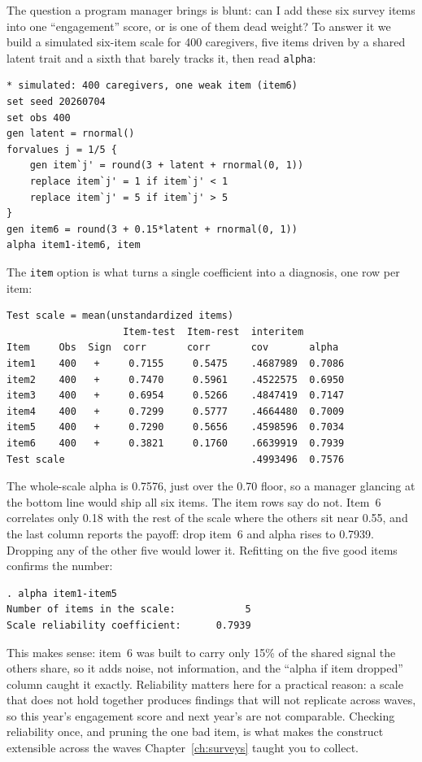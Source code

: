 \documentclass[
    a4paper,
    fontsize=10pt,
    twoside=true,
    numbers=noenddot,
]{kaobook}
\begin{document}
The question a program manager brings is blunt: can I add these six survey items into one \enquote{engagement} score, or is one of them dead weight? To answer it we build a simulated six-item scale for 400 caregivers, five items driven by a shared latent trait and a sixth that barely tracks it, then read \texttt{alpha}:
{\footnotesize
\begin{verbatim}
* simulated: 400 caregivers, one weak item (item6)
set seed 20260704
set obs 400
gen latent = rnormal()
forvalues j = 1/5 {
    gen item`j' = round(3 + latent + rnormal(0, 1))
    replace item`j' = 1 if item`j' < 1
    replace item`j' = 5 if item`j' > 5
}
gen item6 = round(3 + 0.15*latent + rnormal(0, 1))
alpha item1-item6, item
\end{verbatim}
}
The \texttt{item} option is what turns a single coefficient into a diagnosis, one row per item:
{\footnotesize
\begin{verbatim}
Test scale = mean(unstandardized items)
                    Item-test  Item-rest  interitem
Item     Obs  Sign  corr       corr       cov       alpha
item1    400   +     0.7155     0.5475    .4687989  0.7086
item2    400   +     0.7470     0.5961    .4522575  0.6950
item3    400   +     0.6954     0.5266    .4847419  0.7147
item4    400   +     0.7299     0.5777    .4664480  0.7009
item5    400   +     0.7290     0.5656    .4598596  0.7034
item6    400   +     0.3821     0.1760    .6639919  0.7939
Test scale                                .4993496  0.7576
\end{verbatim}
}
The whole-scale alpha is 0.7576, just over the 0.70 floor, so a manager glancing at the bottom line would ship all six items. The item rows say do not. Item~6 correlates only 0.18 with the rest of the scale where the others sit near 0.55, and the last column reports the payoff: drop item~6 and alpha rises to 0.7939. Dropping any of the other five would lower it. Refitting on the five good items confirms the number:
{\footnotesize
\begin{verbatim}
. alpha item1-item5
Number of items in the scale:            5
Scale reliability coefficient:      0.7939
\end{verbatim}
}
This makes sense: item~6 was built to carry only 15\% of the shared signal the others share, so it adds noise, not information, and the \enquote{alpha if item dropped} column caught it exactly. Reliability matters here for a practical reason: a scale that does not hold together produces findings that will not replicate across waves, so this year's engagement score and next year's are not comparable. Checking reliability once, and pruning the one bad item, is what makes the construct extensible across the waves Chapter~\ref{ch:surveys} taught you to collect.
\end{document}
